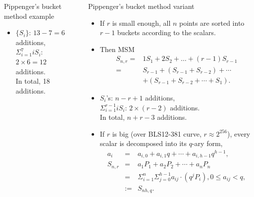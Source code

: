 \documentclass[final]{beamer}
\newlength{\sepwid}
\newlength{\onecolwid}
\begin{document}
\begin{frame}[t]
\begin{columns}[t]
\begin{column}{\onecolwid}
\begin{block}{Pippenger's bucket method example}
\begin{small}
\begin{itemize}
		\item $\{S_i\}$: $13 - 7 = 6$ additions,\\
		$\Sigma_{i = 1}^{7} iS_i$: $2\times 6 = 12$ additions. \\
		In total, 18 additions.	
	\end{itemize}
\end{small}
\end{block}


\end{column} 
\begin{column}{\sepwid}\end{column} %

\begin{column}{\onecolwid} 

\begin{block}{Pippenger's bucket method variant}
\small
	\begin{itemize}	
	\item If $r$ is small enough, all $n$ points are sorted into $r-1$ buckets according to the scalars.
%	
	\item Then MSM
	\begin{equation*}
	\begin{aligned}
	S_{n,r}=& 1 S_{1}+2 S_{2}+\ldots+(r-1) S_{r-1}\\
	=& S_{r-1} + (S_{r-1}+S_{r-2})+\cdots\\
	&+(S_{r-1}+S_{r-2}+\cdots +S_1).
	\end{aligned}
	\end{equation*}
	
	\item $S_i$'s: $n - r + 1$ additions,\\
	$\Sigma_{i = 1}^{r-1} iS_i$: $2\times (r-2)$ additions.\\
	In total, $n+r -3$ additions.	
	\end{itemize}
			
	\begin{itemize}	
			\item If $r$ is big (over BLS12-381 curve, $r\approx 2^{256}$), every scalar is decomposed into its $q$-ary form,
			\begin{eqnarray*}
			a_i &=& a_{i,0} + a_{i,1}q +\cdots+ a_{i,h-1}q^{h-1}, \\
			S_{n,r}&=& a_1P_1+a_2P_2+\cdots + a_nP_n\\
			&=&\Sigma _{i=1}^n\Sigma_{j=0}^{h-1}a_{ij}\cdot (q^{j}P_i), 0 \le a_{ij}< q,\\
			& :=& S_{nh,q}.
			\end{eqnarray*}
			

\end{itemize}
\end{block}
\end{column}
\end{columns}
\end{frame}
\end{document}
